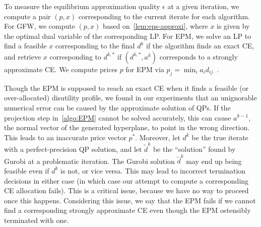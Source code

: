 \documentclass[format=acmsmall,authorversion]{acmart}
\newcommand{\ck}[1]{{\textcolor{red}{CK: #1}}}
\begin{document}

To measure the equilibrium approximation quality $\epsilon$ at a given iteration, we compute a pair $(p, x)$ corresponding to the current iterate for each algorithm. 
For GFW, we compute $(p, x)$ based on~\cref{lem:eps-approxi}, where $x$ is given by the optimal dual variable of the corresponding LP. For EPM, we solve an LP to find a feasible $x$ corresponding to the final $d^k$ if the algorithm finds an exact CE, and retrieve $x$ corresponding to $d^{k, *}$ if $(d^{k, *}, a^k)$ corresponds to a strongly approximate CE. We compute prices $p$ for EPM via $p_j = \min_i a_i d_{ij}$~\citep{boodaghians2022polynomial}. 

Though the EPM is supposed to reach an exact CE when it finds a feasible (or over-allocated) disutility profile, we found in our experiments that an unignorable numerical error can be caused by the approximate solution of QPs.
If the projection step in~\cref{algo:EPM} cannot be solved accurately, this can cause $a^{k-1}$, the normal vector of the generated hyperplane, to point in the wrong direction. 
This leads to an inaccurate price vector $p^*$. 
Moreover, let $d^k$ be the true iterate with a perfect-precision QP solution, and let $\tilde{d}^k$ be the ``solution'' found by Gurobi at a problematic iteration.
The Gurobi solution $\tilde{d}^k$ may end up being feasible even if $d^k$ is not, or vice versa. This may lead to incorrect termination decisions in either case (in which case our attempt to compute a corresponding CE allocation fails).
This is a critical issue, because we have no way to proceed once this happens.
Considering this issue, we say that the EPM fails if we cannot find a corresponding strongly approximate CE even though the EPM ostensibly terminated with one.
\end{document}
